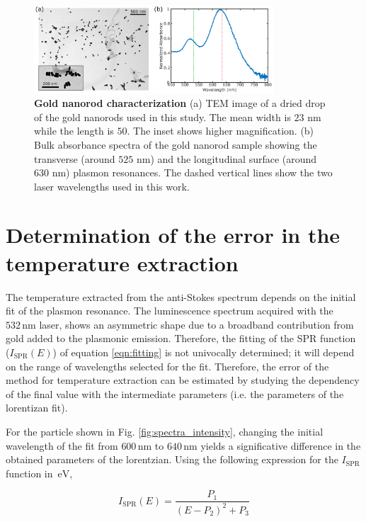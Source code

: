\documentclass[journal=nalefd,manuscript=letter]{achemso}
\newcommand{\nm}{\ensuremath{\,\textrm{nm}}}
\newcommand{\eV}{\ensuremath{\,\textrm{eV}}}
\begin{document}
\begin{figure}[htp] \centering
\includegraphics[width=0.8\textwidth]{Figures/Supplementary/07_GNRs_Characterization_TEM/GNRs_characterization.png}
\caption{\textbf{Gold nanorod characterization} (a) TEM image of a dried drop of  the gold nanorods used in this study. The mean width is $23$ nm while the length is $50$. The inset shows higher magnification. (b) Bulk absorbance spectra of the gold nanorod sample showing the transverse (around $525$ nm) and the longitudinal surface (around $630$ nm) plasmon resonances. The dashed vertical lines show the two laser wavelengths used in this work.}
	\label{fg:nr-char}
\end{figure}


\section{Determination of the error in the temperature extraction}\label{sec:discussion_errors} 

The temperature extracted from the anti-Stokes spectrum depends on the initial fit of the plasmon resonance. The luminescence spectrum acquired with the $532\nm$ laser, shows an asymmetric shape due to a broadband contribution from gold added to the plasmonic emission. Therefore, the fitting of the SPR function ($I_\textrm{SPR}(E)$) of equation \ref{eqn:fitting} is not univocally determined; it will depend on the range of wavelengths selected for the fit. Therefore, the error of the method for temperature extraction can be estimated by studying the dependency of the final value with the intermediate parameters (i.e. the parameters of the lorentizan fit).

For the particle shown in Fig. \ref{fig:spectra_intensity}, changing the initial wavelength of the fit from $600\nm$ to $640\nm$ yields a significative difference in the obtained parameters of the lorentzian. Using the following expression for the $I_\textrm{SPR}$ function in $\eV$, 

\begin{equation*}
I_\textrm{SPR}(E) = \frac{P_1}{(E-P_2)^2+P_3}
\end{equation*}
\end{document}
